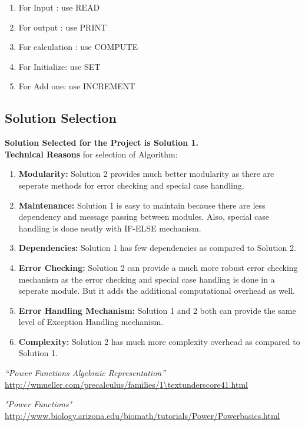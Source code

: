 \documentclass[a4paper,12pt]{article}
\begin{document}
\begin{enumerate}
	\item For Input : use READ
	\item For output : use PRINT
	\item For calculation : use COMPUTE
	\item For Initialize: use SET 
	\item For Add one: use INCREMENT 
\end{enumerate}

\vspace{0.5cm}

\subsection{Solution Selection}
\textbf{Solution Selected for the Project is Solution 1.}\\

\textbf{Technical Reasons} for selection of Algorithm:
\begin{enumerate}
	\item \textbf{Modularity:} Solution 2 provides much better modularity as there are seperate methods for error checking and special case handling.
	\item \textbf{Maintenance:} Solution 1 is easy to maintain because there are less dependency and message passing between modules. Also, special case handling is done neatly with IF-ELSE mechanism.
	\item \textbf{Dependencies:} Solution 1 has few dependencies as compared to Solution 2.
	\item \textbf{Error Checking:} Solution 2 can provide a much more robust error checking mechanism as the error checking and special case handling is done in a seperate module. But it adds the additional computational overhead as well.
	\item \textbf{Error Handling Mechanism:} Solution 1 and 2 both can provide the same level of Exception Handling mechanism.
	\item \textbf{Complexity:} Solution 2 has much more complexity overhead as compared to Solution 1.
\end{enumerate}



\vspace{1cm}

\begin{thebibliography}{3}
	
	 \emph{“Power Functions Algebraic Representation”} \url{http://wmueller.com/precalculus/families/1\textunderscore41.html} 
	
	 \emph{"Power Functions"} \url{http://www.biology.arizona.edu/biomath/tutorials/Power/Powerbasics.html}
	
\end{thebibliography}

\end{document}
